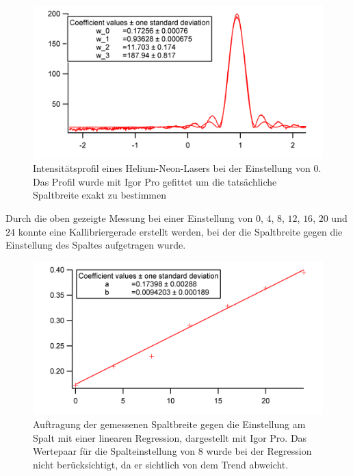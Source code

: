 \begin{figure}[H]
	\centering	
	\begin{minipage}{1\textwidth}
		\includegraphics[width=\columnwidth]{180618/GraphSB0.png}
	\end{minipage}
	\caption{Intensitätsprofil eines Helium-Neon-Lasers bei der Einstellung von $0$. Das Profil wurde mit Igor Pro gefittet um die tatsächliche Spaltbreite exakt zu bestimmen }
	\label{HeNe_0_Prof}
\end{figure}

Durch die oben gezeigte Messung bei einer Einstellung von $0$, $4$, $8$, $12$, $16$, $20$ und $24$ konnte eine Kallibriergerade erstellt werden, bei der die Spaltbreite gegen die Einstellung des Spaltes aufgetragen wurde.

\begin{figure}[H]
	\centering	
	\begin{minipage}{1\textwidth}
		\includegraphics[width=\columnwidth]{180618/Graph_kal.png}
	\end{minipage}
	\caption{Auftragung der gemessenen Spaltbreite gegen die Einstellung am Spalt mit einer linearen Regression, dargestellt mit Igor Pro. Das Wertepaar für die Spalteinstellung von 8 wurde bei der Regression nicht berücksichtigt, da er sichtlich von dem Trend abweicht.}
	\label{HeNe_0_Prof}
\end{figure}

